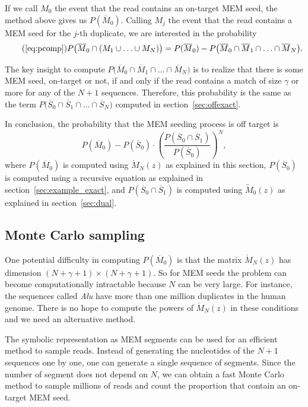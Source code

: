 \documentclass{article}
\begin{document}
If we call $M_0$ the event that the read contains an on-target MEM seed,
the method above gives us $P(\overline{M}_0)$. Calling $M_j$ the event
that the read contains a MEM seed for the $j$-th duplicate, we are
interested in the probability
\begin{equation*}
\tag{\ref{eq:pcomp}}
P\big(\overline{M}_0 \cap (M_1 \cup \ldots \cup M_N)\big) =
P(\overline{M}_0) - P\big(\overline{M}_0 \cap \overline{M}_1 \cap \ldots
\cap \overline{M}_N\big).
\end{equation*}

The key insight to compute $P\big(\overline{M}_0 \cap \overline{M}_1 \cap
\ldots \cap \overline{M}_N\big)$ is to realize that there is some MEM
seed, on-target or not, if and only if the read contains a match of size
$\gamma$ or more for any of the $N+1$ sequences. Therefore, this
probability is the same as the term $P\big(\overline{S}_0 \cap
\overline{S}_1 \cap \ldots \cap \overline{S}_N\big)$ computed in
section~\ref{sec:offexact}.

In conclusion, the probability that the MEM seeding process is off target
is
\begin{equation*}
P(\overline{M}_0) - P(\overline{S}_0) \cdot \left( \frac{P(\overline{S}_0
\cap \overline{S}_1)}{P(\overline{S}_0)} \right)^N,
\end{equation*}
where $P(\overline{M}_0)$ is computed using $\mathring{M}_N(z)$ as
explained in this section, $P(\overline{S}_0)$ is computed using a
recursive equation as explained in section~\ref{sec:example_exact}, and
$P(\overline{S}_0\cap\overline{S}_1)$ is computed using $\tilde{M}_0(z)$
as explained in section~\ref{sec:dual}.

\subsection{Monte Carlo sampling}
\label{sec:montecarlo}

One potential difficulty in computing $P(\overline{M}_0)$ is that the
matrix $\mathring{M}_N(z)$ has dimension $(N+\gamma+1) \times
(N+\gamma+1)$. So for MEM seeds the problem can become computationally
intractable because $N$ can be very large. For instance, the sequences
called \emph{Alu} have more than one million duplicates in the human
genome. There is no hope to compute the powers of $\mathring{M}_N(z)$ in
these conditions and we need an alternative method.

The symbolic representation as MEM segments can be used for an efficient
method to sample reads. Instead of generating the nucleotides of the $N+1$
sequences one by one, one can generate a single sequence of segments.
Since the number of segment does not depend on $N$, we can obtain a fast
Monte Carlo method to sample millions of reads and count the proportion
that contain an on-target MEM seed.
\end{document}
